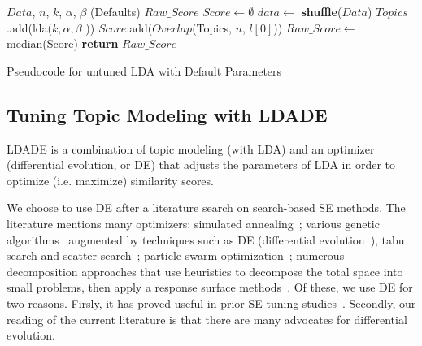 \documentclass[10pt,conference]{IEEEtran}
\theoremstyle{break}
\begin{document}
\makeatletter
\algrenewcommand\ALG@beginalgorithmic{\footnotesize}
\algrenewcommand{}
\makeatother
\renewcommand{\algorithmicrequire}{\textbf{Input:}}
\renewcommand{\algorithmicensure}{\textbf{Output:}}
\begin{algorithm}
    
    \begin{algorithmic}[1]
    \Require $Data$, $n$, $k$, $\alpha$, $\beta$ (Defaults) 
    \Ensure $Raw\_Score$    
        \State $Score \leftarrow \emptyset$
                \State $data \leftarrow$ \textbf{shuffle}($Data$)
                \State $Topics$.add(lda($k,\alpha,\beta$ ))
            \EndFor
            \State $Score$.add($Overlap$(Topics, $n$, $l[0]$))
        \EndFor
        \State $Raw\_Score \leftarrow $ median(Score)
        \State \textbf{return} $Raw\_Score$
    \EndFunction
    \caption{Pseudocode for untuned LDA with Default Parameters}
    \end{algorithmic}
\end{algorithm}

\subsection{Tuning Topic Modeling with LDADE}
\label{sect: tuning}
LDADE is a combination of topic modeling (with LDA) and an optimizer (differential evolution, or DE) that adjusts
the parameters of LDA in order to optimize (i.e. maximize) similarity scores.

We choose to use DE after a literature search on search-based SE methods.
The literature mentions many optimizers: simulated
annealing~\cite{feather2002converging, menzies2007business}; various genetic
algorithms~\cite{goldberg1979complexity} augmented by techniques such as
DE (differential evolution~\cite{storn1997differential}), tabu search and scatter
search~\cite{glover1986general, beausoleil2006moss, molina2007sspmo,
  nebro2008abyss}; particle swarm optimization~\cite{pan2008particle}; numerous
decomposition approaches that use heuristics to decompose the total space into
small problems, then apply a response surface methods~\cite{krall2015gale,
  zuluaga2013active}.
Of these, we use DE for two reasons. Firsly, it has proved useful in prior SE tuning
studies~\cite{wei2006lda}. Secondly,   our reading of the current literature is
that there are many advocates for differential evolution.
\end{document}
